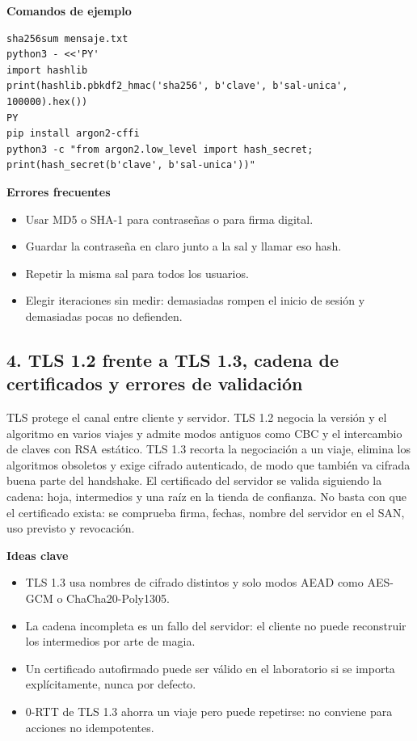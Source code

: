 \documentclass[11pt,a4paper]{article}
\begin{document}
\textbf{Comandos de ejemplo}

\begin{lstlisting}[style=estiloCodigo]
sha256sum mensaje.txt
python3 - <<'PY'
import hashlib
print(hashlib.pbkdf2_hmac('sha256', b'clave', b'sal-unica', 100000).hex())
PY
pip install argon2-cffi
python3 -c "from argon2.low_level import hash_secret; print(hash_secret(b'clave', b'sal-unica'))"
\end{lstlisting}

\textbf{Errores frecuentes}

\begin{itemize}[leftmargin=1.4em,itemsep=2pt,topsep=3pt]
  \item Usar MD5 o SHA-1 para contraseñas o para firma digital.
  \item Guardar la contraseña en claro junto a la sal y llamar eso hash.
  \item Repetir la misma sal para todos los usuarios.
  \item Elegir iteraciones sin medir: demasiadas rompen el inicio de sesión y demasiadas pocas no defienden.
\end{itemize}


\subsection{4. TLS 1.2 frente a TLS 1.3, cadena de certificados y errores de validación}

TLS protege el canal entre cliente y servidor. TLS 1.2 negocia la versión y el algoritmo en varios viajes y admite modos antiguos como CBC y el intercambio de claves con RSA estático. TLS 1.3 recorta la negociación a un viaje, elimina los algoritmos obsoletos y exige cifrado autenticado, de modo que también va cifrada buena parte del handshake. El certificado del servidor se valida siguiendo la cadena: hoja, intermedios y una raíz en la tienda de confianza. No basta con que el certificado exista: se comprueba firma, fechas, nombre del servidor en el SAN, uso previsto y revocación.

\textbf{Ideas clave}

\begin{itemize}[leftmargin=1.4em,itemsep=2pt,topsep=3pt]
  \item TLS 1.3 usa nombres de cifrado distintos y solo modos AEAD como AES-GCM o ChaCha20-Poly1305.
  \item La cadena incompleta es un fallo del servidor: el cliente no puede reconstruir los intermedios por arte de magia.
  \item Un certificado autofirmado puede ser válido en el laboratorio si se importa explícitamente, nunca por defecto.
  \item 0-RTT de TLS 1.3 ahorra un viaje pero puede repetirse: no conviene para acciones no idempotentes.
\end{itemize}
\end{document}
